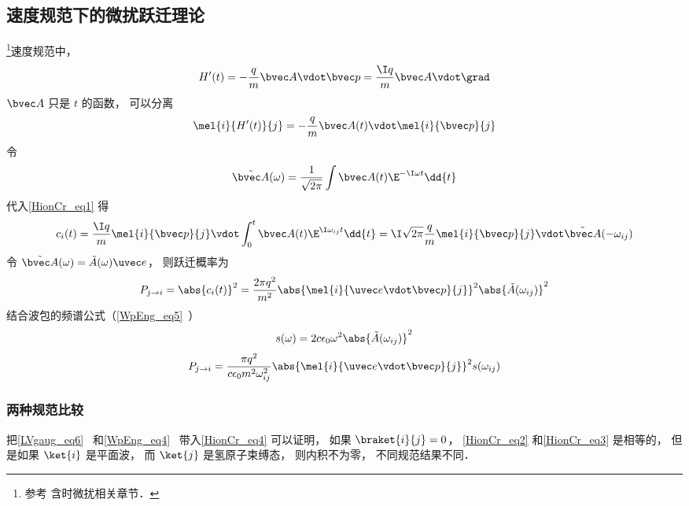 \subsection{速度规范下的微扰跃迁理论}
\footnote{参考\cite{Merzbacher} 含时微扰相关章节．}速度规范中，
\begin{equation}
H'(t) = -\frac{q}{m}\bvec A \vdot \bvec p = \frac{\I q}{m}\bvec A \vdot \grad
\end{equation}
$\bvec A$ 只是 $t$ 的函数， 可以分离
\begin{equation}
\mel{i}{H'(t)}{j} = -\frac{q}{m}\bvec A(t) \vdot \mel{i}{\bvec p}{j}
\end{equation}
令
\begin{equation}
\tilde {\bvec A}(\omega) = \frac{1}{\sqrt{2\pi}} \int \bvec A(t) \E^{-\I\omega t} \dd{t}
\end{equation}
代入\autoref{HionCr_eq1} 得
\begin{equation}\label{HionCr_eq4}
c_i(t) = \frac{\I q}{m} \mel{i}{\bvec p}{j} \vdot \int_0^t  \bvec A(t) \E^{\I\omega_{ij} t} \dd{t} = \I\sqrt{2\pi}\frac{q}{m} \mel{i}{\bvec p}{j} \vdot \tilde {\bvec A}(-\omega_{ij})
\end{equation}
令 $\tilde {\bvec A}(\omega) = \tilde {A}(\omega)\uvec e$， 则跃迁概率为
\begin{equation}\label{HionCr_eq3}
P_{j\to i} = \abs{c_i(t)}^2 = \frac{2\pi q^2}{m^2} \abs{\mel{i}{\uvec e \vdot\bvec p}{j}}^2 \abs{\tilde {A}(\omega_{ij})}^2
\end{equation}
结合波包的频谱公式（\autoref{WpEng_eq5}~）
\begin{equation}
s(\omega) = 2c\epsilon_0 \omega^2 \abs{\tilde {A}(\omega_{ij})}^2
\end{equation}
\begin{equation}
P_{j\to i} = \frac{\pi q^2}{c\epsilon_0 m^2 \omega_{ij}^2} \abs{\mel{i}{\uvec e \vdot \bvec p}{j}}^2 s(\omega_{ij})
\end{equation}

\subsubsection{两种规范比较}
把\autoref{LVgaug_eq6}~ 和\autoref{WpEng_eq4}~ 带入\autoref{HionCr_eq4} 可以证明， 如果 $\braket{i}{j} = 0$， \autoref{HionCr_eq2} 和\autoref{HionCr_eq3} 是相等的， 但是如果 $\ket{i}$ 是平面波， 而 $\ket{j}$ 是氢原子束缚态， 则内积不为零， 不同规范结果不同．

